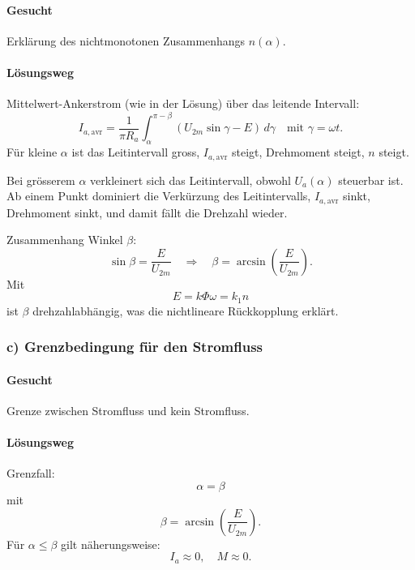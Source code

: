 \paragraph{Gesucht}
Erklärung des nichtmonotonen Zusammenhangs $n(\alpha)$.

\paragraph{Lösungsweg}
Mittelwert-Ankerstrom (wie in der Lösung) über das leitende Intervall:
\[
\boxed{
I_{a,\mathrm{avr}}
=
\frac{1}{\pi R_a}\int_{\alpha}^{\pi-\beta}\left(U_{2m}\sin\gamma - E\right)\,d\gamma
}
\quad \text{mit } \gamma=\omega t.
\]
Für kleine $\alpha$ ist das Leitintervall gross, $I_{a,\mathrm{avr}}$ steigt, Drehmoment steigt, $n$ steigt.

Bei grösserem $\alpha$ verkleinert sich das Leitintervall, obwohl $U_a(\alpha)$ steuerbar ist.
Ab einem Punkt dominiert die Verkürzung des Leitintervalls, $I_{a,\mathrm{avr}}$ sinkt, Drehmoment sinkt,
und damit fällt die Drehzahl wieder.

Zusammenhang Winkel $\beta$:
\[
\sin\beta=\frac{E}{U_{2m}}
\quad\Rightarrow\quad
\boxed{\beta=\arcsin\!\left(\frac{E}{U_{2m}}\right)}.
\]
Mit
\[
E=k\Phi\omega=k_1 n
\]
ist $\beta$ drehzahlabhängig, was die nichtlineare Rückkopplung erklärt.


\subsubsection*{c) Grenzbedingung für den Stromfluss}

\paragraph{Gesucht}
Grenze zwischen Stromfluss und kein Stromfluss.

\paragraph{Lösungsweg}
Grenzfall:
\[
\boxed{\alpha=\beta}
\]
mit
\[
\boxed{\beta=\arcsin\!\left(\frac{E}{U_{2m}}\right)}.
\]
Für $\alpha\le\beta$ gilt näherungsweise:
\[
I_a \approx 0,\quad M\approx 0.
\]

